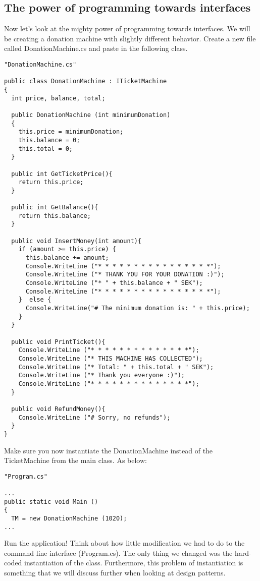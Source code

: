 \documentclass{article}
\begin{document}
\subsection{The power of programming towards interfaces}
Now let’s look at the mighty power of programming towards interfaces. We will be creating a donation machine with slightly different behavior. Create a new file called DonationMachine.cs and paste in the following class.
\begin{lstlisting}
"DonationMachine.cs"

public class DonationMachine : ITicketMachine
{
  int price, balance, total;

  public DonationMachine (int minimumDonation)
  {
    this.price = minimumDonation;
    this.balance = 0;
    this.total = 0;
  }
  
  public int GetTicketPrice(){
    return this.price;
  }
  
  public int GetBalance(){
    return this.balance;
  }
  
  public void InsertMoney(int amount){
    if (amount >= this.price) {
      this.balance += amount;
      Console.WriteLine ("* * * * * * * * * * * * * * * *");
      Console.WriteLine ("* THANK YOU FOR YOUR DONATION :)");
      Console.WriteLine ("* " + this.balance + " SEK");
      Console.WriteLine ("* * * * * * * * * * * * * * * *");
    }  else {
      Console.WriteLine("# The minimum donation is: " + this.price);
    }
  }
  
  public void PrintTicket(){
    Console.WriteLine ("* * * * * * * * * * * * * *");
    Console.WriteLine ("* THIS MACHINE HAS COLLECTED");
    Console.WriteLine ("* Total: " + this.total + " SEK");
    Console.WriteLine ("* Thank you everyone :)");
    Console.WriteLine ("* * * * * * * * * * * * * *");
  }
  
  public void RefundMoney(){
    Console.WriteLine ("# Sorry, no refunds");
  }
}
\end{lstlisting}
Make sure you now instantiate the DonationMachine instead of the TicketMachine from the main class. As below:
\begin{lstlisting}
"Program.cs"

...
public static void Main ()
{ 
  TM = new DonationMachine (1020);
...
\end{lstlisting}
Run the application! Think about how little modification we had to do to the command line interface (Program.cs). The only thing we changed was the hard-coded instantiation of the class. Furthermore, this problem of instantiation is something that we will discuss further when looking at design patterns.
\end{document}
